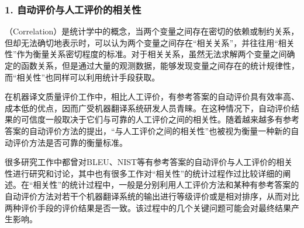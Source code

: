 
\subsubsection{1. 自动评价与人工评价的相关性}

（Correlation）是统计学中的概念，当两个变量之间存在密切的依赖或制约关系，但却无法确切地表示时，可以认为两个变量之间存在“相关关系”，并往往用“相关性”作为衡量关系密切程度的标准。对于相关关系，虽然无法求解两个变量之间确定的函数关系，但是通过大量的观测数据，能够发现变量之间存在的统计规律性，而“相关性”也同样可以利用统计手段获取。

\parinterval 在机器译文质量评价工作中，相比人工评价，有参考答案的自动评价具有效率高、成本低的优点，因而广受机器翻译系统研发人员青睐。在这种情况下，自动评价结果的可信度一般取决于它们与可靠的人工评价之间的相关性。随着越来越多有参考答案的自动评价方法的提出，“与人工评价之间的相关性”也被视为衡量一种新的自动评价方法是否可靠的衡量标准。

\parinterval 很多研究工作中都曾对BLEU、NIST等有参考答案的自动评价与人工评价的相关性进行研究和讨论，其中也有很多工作对“相关性”的统计过程作过比较详细的阐述。在“相关性”的统计过程中，一般是分别利用人工评价方法和某种有参考答案的自动评价方法对若干个机器翻译系统的输出进行等级评价或是相对排序，从而对比两种评价手段的评价结果是否一致。该过程中的几个关键问题可能会对最终结果产生影响。

